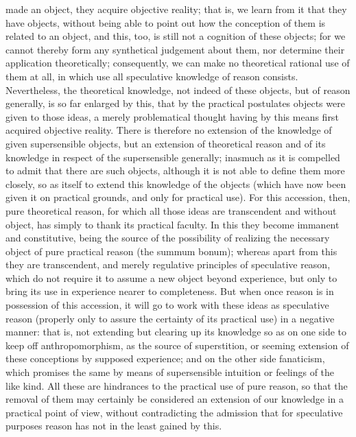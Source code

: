 \documentclass[12pt]{article}
\begin{document}
made an object, they acquire objective reality; that is, we learn from it that they have objects, without being able to point out how the conception of them is related to an object, and this, too, is still not a cognition of these objects; for we cannot thereby form any synthetical judgement about them, nor determine their application theoretically; consequently, we can make no theoretical rational use of them at all, in which use all speculative knowledge of reason consists. Nevertheless, the theoretical knowledge, not indeed of these objects, but of reason generally, is so far enlarged by this, that by the practical postulates objects were given to those ideas, a merely problematical thought having by this means first acquired objective reality. There is therefore no extension of the knowledge of given supersensible objects, but an extension of theoretical reason and of its knowledge in respect of the supersensible generally; inasmuch as it is compelled to admit that there are such objects, although it is not able to define them more closely, so as itself to extend this knowledge of the objects (which have now been given it on practical grounds, and only for practical use). For this accession, then, pure theoretical reason, for which all those ideas are transcendent and without object, has simply to thank its practical faculty. In this they become immanent and constitutive, being the source of the possibility of realizing the necessary object of pure practical reason (the summum bonum); whereas apart from this they are transcendent, and merely regulative principles of speculative reason, which do not require it to assume a new object beyond experience, but only to bring its use in experience nearer to completeness. But when once reason is in possession of this accession, it will go to work with these ideas as speculative reason (properly only to assure the certainty of its practical use) in a negative manner: that is, not extending but clearing up its knowledge so as on one side to keep off anthropomorphism, as the source of superstition, or seeming extension of these conceptions by supposed experience; and on the other side fanaticism, which promises the same by means of supersensible intuition or feelings of the like kind. All these are hindrances to the practical use of pure reason, so that the removal of them may certainly be considered an extension of our knowledge in a practical point of view, without contradicting the admission that for speculative purposes reason has not in the least gained by this.
\end{document}
